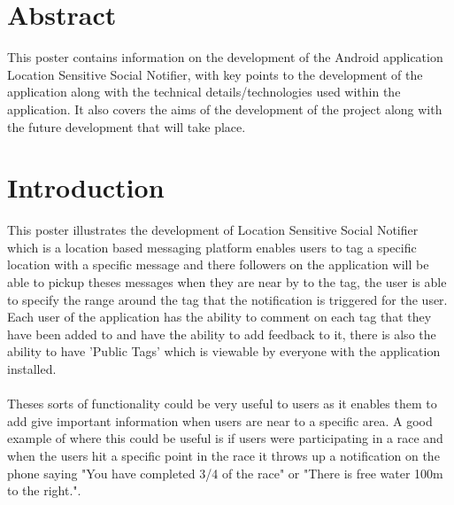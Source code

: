 \documentclass[a0,landscape]{a0poster}
\begin{document}
\begin{multicols}{5} %

\color{Navy}
\section{Abstract}

This poster contains information on the development of the Android application Location Sensitive Social Notifier, with key points to the development of the application along with the technical details/technologies used within the application. It also covers the aims of the development of the project along with the future development that will take place.

\vspace{-10pt}
\color{Olive}
\section{Introduction}

This poster illustrates the development of Location Sensitive Social Notifier which is a location based messaging platform enables users to tag a specific location with a specific message and there followers on the application will be able to pickup theses messages when they are near by to the tag, the user is able to specify the range around the tag that the notification is triggered for the user. Each user of the application has the ability to comment on each tag that they have been added to and have the ability to add feedback to it, there is also the ability to have 'Public Tags' which is viewable by everyone with the application installed.\\
\\
Theses sorts of functionality could be very useful to users as it enables them to add give important information when users are near to a specific area. A good example of where this could be useful is if users were participating in a race and when the users hit a specific point in the race it throws up a notification on the phone saying "You have completed 3/4 of the race" or "There is free water 100m to the right.".\\


\end{multicols}
\end{document}
